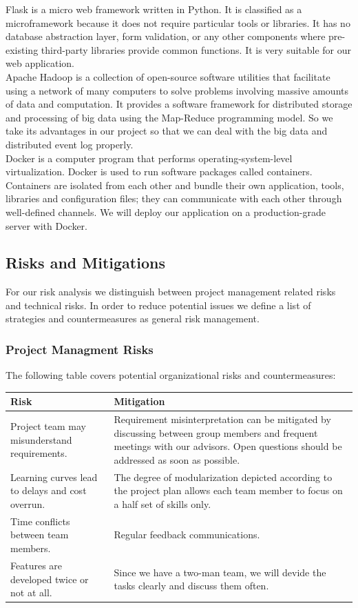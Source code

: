 \documentclass[runningheads]{llncs}
\begin{document}
\noindent
Flask is a micro web framework written in Python. It is classified as a microframework because it does not require particular tools or libraries. It has no database abstraction layer, form validation, or any other components where pre-existing third-party libraries provide common functions. It is very suitable for our web application.\\

\noindent
Apache Hadoop is a collection of open-source software utilities that facilitate using a network of many computers to solve problems involving massive amounts of data and computation. It provides a software framework for distributed storage and processing of big data using the Map-Reduce programming model. So we take its advantages in our project so that we can deal with the big data and distributed event log properly.\\

\noindent
Docker is a computer program that performs operating-system-level virtualization. Docker is used to run software packages called containers. Containers are isolated from each other and bundle their own application, tools, libraries and configuration files; they can communicate with each other through well-defined channels. We will deploy our application on a production-grade server with Docker.

\subsection{Risks and Mitigations}
For our risk analysis we distinguish between project management related risks and technical risks. In order to reduce potential issues we define a list of strategies and countermeasures as general risk management.

\subsubsection{Project Managment Risks}

The following table covers potential organizational risks and countermeasures:\\

\renewcommand\arraystretch{1.5}
\begin{tabular}{p{5cm}|p{6cm}}
	Risk& Mitigation\\
	\hline
	Project team may misunderstand requirements.& Requirement misinterpretation can be mitigated by discussing between group members and frequent meetings with our advisors. Open questions should be addressed as soon as possible.\\
	\hline
	Learning curves lead to delays and cost overrun.& The degree of modularization depicted according to the project plan allows each team member to focus on a half set of skills only.\\
	\hline
	Time conflicts between team members.& Regular feedback communications.\\
	\hline
	Features are developed twice or not at all.& Since we have a two-man team, we will devide the tasks clearly and discuss them often.\\
\end{tabular}
\end{document}
